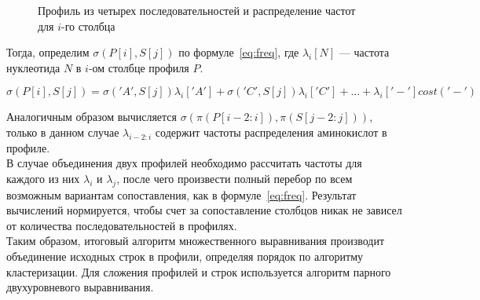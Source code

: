 \begin{figure}[h]
	\caption{Профиль из четырех последовательностей и распределение частот для $i$-го столбца}
	\label{ris:profile}
\end{figure}

Тогда, определим $\sigma(P[i], S[j])$ по формуле~\ref{eq:freq}, где $\lambda_i[N]$ --- частота нуклеотида $N$ в $i$-ом столбце профиля $P$.

\begin{equation}\label{eq:freq}
\sigma(P[i], S[j])=\sigma('A', S[j])\lambda_i['A']+\sigma('C', S[j])\lambda_i['C']+ \dots +\lambda_i['-']cost('-')
\end{equation}

Аналогичным образом вычисляется $\sigma(\pi(P[i-2:i]), \pi(S[j-2:j]))$, только в данном случае $\lambda_{i-2:i}$ содержит частоты распределения аминокислот в профиле.\\
\indent В случае объединения двух профилей необходимо рассчитать частоты для каждого из них $\lambda_i$ и $\lambda_j$, после чего произвести полный перебор по всем возможным вариантам сопоставления, как в формуле~\ref{eq:freq}. Результат вычислений нормируется, чтобы счет за сопоставление столбцов никак не зависел от количества последовательностей в профилях.\\
\indent Таким образом, итоговый алгоритм множественного выравнивания производит объединение исходных строк в профили, определяя порядок по алгоритму кластеризации. Для сложения профилей и строк используется алгоритм парного двухуровневого выравнивания.